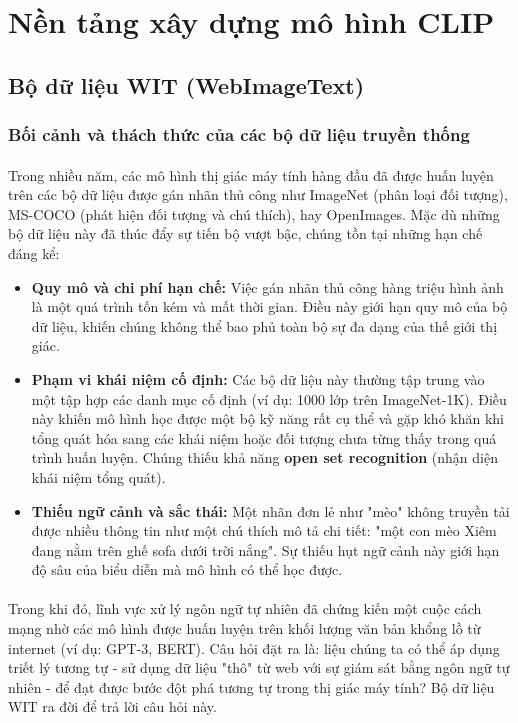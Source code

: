 \newpage
\section{Nền tảng xây dựng mô hình CLIP}

\subsection{Bộ dữ liệu WIT (WebImageText)}
\subsubsection{Bối cảnh và thách thức của các bộ dữ liệu truyền thống}
\paragraph{}{Trong nhiều năm, các mô hình thị giác máy tính hàng đầu đã được huấn luyện trên các bộ dữ liệu được gán nhãn thủ công như ImageNet (phân loại đối tượng), MS-COCO (phát hiện đối tượng và chú thích), hay OpenImages. Mặc dù những bộ dữ liệu này đã thúc đẩy sự tiến bộ vượt bậc, chúng tồn tại những hạn chế đáng kể:}
\begin{itemize}
\item \textbf{Quy mô và chi phí hạn chế:} Việc gán nhãn thủ công hàng triệu hình ảnh là một quá trình tốn kém và mất thời gian. Điều này giới hạn quy mô của bộ dữ liệu, khiến chúng không thể bao phủ toàn bộ sự đa dạng của thế giới thị giác.
\item \textbf{Phạm vi khái niệm cố định:} Các bộ dữ liệu này thường tập trung vào một tập hợp các danh mục cố định (ví dụ: 1000 lớp trên ImageNet-1K). Điều này khiến mô hình học được một bộ kỹ năng rất cụ thể và gặp khó khăn khi tổng quát hóa sang các khái niệm hoặc đối tượng chưa từng thấy trong quá trình huấn luyện. Chúng thiếu khả năng \textbf{open set recognition} (nhận diện khái niệm tổng quát).
\item \textbf{Thiếu ngữ cảnh và sắc thái:} Một nhãn đơn lẻ như "mèo" không truyền tải được nhiều thông tin như một chú thích mô tả chi tiết: "một con mèo Xiêm đang nằm trên ghế sofa dưới trời nắng". Sự thiếu hụt ngữ cảnh này giới hạn độ sâu của biểu diễn mà mô hình có thể học được.
\end{itemize}
\paragraph{}{Trong khi đó, lĩnh vực xử lý ngôn ngữ tự nhiên đã chứng kiến một cuộc cách mạng nhờ các mô hình được huấn luyện trên khối lượng văn bản khổng lồ từ internet (ví dụ: GPT-3, BERT). Câu hỏi đặt ra là: liệu chúng ta có thể áp dụng triết lý tương tự - sử dụng dữ liệu "thô" từ web với sự giám sát bằng ngôn ngữ tự nhiên - để đạt được bước đột phá tương tự trong thị giác máy tính? Bộ dữ liệu WIT ra đời để trả lời câu hỏi này.}
